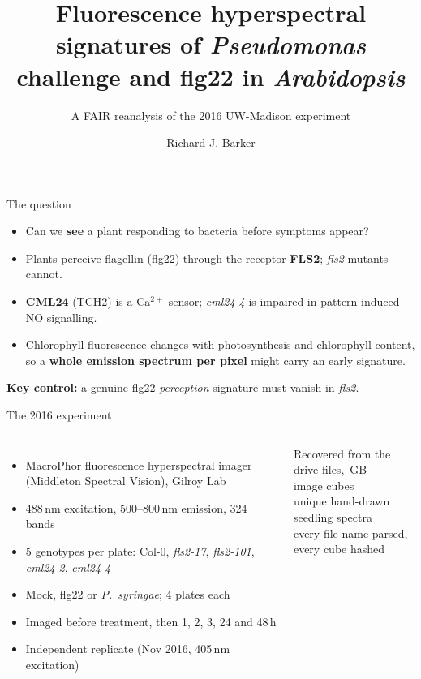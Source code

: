 \documentclass[aspectratio=169,10pt]{beamer}
\title[PathoFluor-At]{Fluorescence hyperspectral signatures of \textit{Pseudomonas} challenge
and flg22 in \textit{Arabidopsis}}
\subtitle{A FAIR reanalysis of the 2016 UW-Madison experiment}
\author[Barker]{Richard J. Barker}
\date{\pending{date / venue}}
\begin{document}
\begin{frame}
  \titlepage
\end{frame}

\begin{frame}{The question}
  \begin{itemize}
    \item Can we \textbf{see} a plant responding to bacteria before symptoms appear?
    \item Plants perceive flagellin (flg22) through the receptor \textbf{FLS2}; \textit{fls2}
          mutants cannot.
    \item \textbf{CML24} (TCH2) is a Ca$^{2+}$ sensor; \textit{cml24-4} is impaired in
          pattern-induced NO signalling.
    \item Chlorophyll fluorescence changes with photosynthesis and chlorophyll content, so a
          \textbf{whole emission spectrum per pixel} might carry an early signature.
  \end{itemize}
  \vfill
  \textbf{Key control:} a genuine flg22 \emph{perception} signature must vanish in \textit{fls2}.
\end{frame}

\begin{frame}{The 2016 experiment}
  \begin{columns}[T]
    \begin{itemize}
      \item MacroPhor fluorescence hyperspectral imager (Middleton Spectral Vision), Gilroy Lab
      \item 488\,nm excitation, 500--800\,nm emission, 324 bands
      \item 5 genotypes per plate: Col-0, \textit{fls2-17}, \textit{fls2-101},
            \textit{cml24-2}, \textit{cml24-4}
      \item Mock, flg22 or \textit{P.~syringae}; 4 plates each
      \item Imaged before treatment, then 1, 2, 3, 24 and 48\,h
      \item Independent replicate (Nov 2016, 405\,nm excitation)
    \end{itemize}
    \begin{block}{Recovered from the drive}
      \nFiles{} files, \rawGB{}\,GB\\
      \nCubes{} image cubes\\
      \nRoiUnique{} unique hand-drawn seedling spectra\\
      every file name parsed, every cube hashed
    \end{block}
  \end{columns}
\end{frame}
\end{document}
